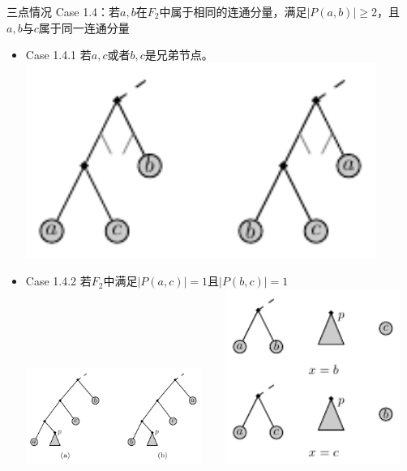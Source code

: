 \documentclass[slidestop,compress,mathserif,red]{beamer}
\begin{document}
\begin{frame}{三点情况}
Case 1.4：若$a,b$在$F_2$中属于相同的连通分量，满足$|P(a,b)| \ge 2$，且$a,b$与$c$属于同一连通分量
\pause
\begin{itemize}
  \item Case 1.4.1 若$a,c$或者$b,c$是兄弟节点。\\
  \includegraphics[width=0.9\textwidth, height=0.25\textheight, keepaspectratio]{./pic/case_1_4_1.pdf}
  \pause
  \item Case 1.4.2 若$F_2$中满足$|P(a,c)|=1$且$|P(b,c)|=1$ \\
  \includegraphics[width=0.45\textwidth, height=0.35\textheight, keepaspectratio]{./pic/case_1_4_2.pdf}
  ~~~
  \includegraphics[width=0.45\textwidth, height=0.35\textheight, keepaspectratio]{./pic/case_1_4_2_eq.pdf}
\end{itemize}
\end{frame}
\end{document}
